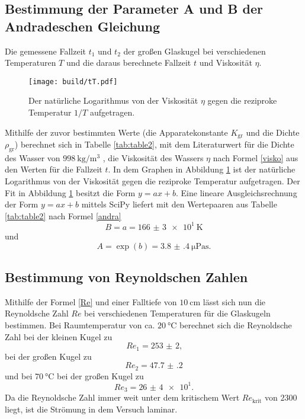 \subsection{Bestimmung der Parameter A und B der Andradeschen Gleichung}
\begin{table}
	\centering
	\caption{Die gemessene Fallzeit $t_1$ und $t_2$ der großen Glaskugel bei verschiedenen Temperaturen $T$ und die daraus berechnete Fallzeit $t$ und Viskosität $\eta$.}
	
\end{table}
\begin{figure}
	\centering
	\caption{Der natürliche Logarithmus von der Viskosität $\eta$ gegen die reziproke Temperatur $1/T$ aufgetragen.}
	\texttt{[image: build/tT.pdf]}
	\label{fig:Graph}
\end{figure}
Mithilfe der zuvor bestimmten Werte (die Apparatekonstante $K_\text{gr}$ und die Dichte $\rho_\text{gr}$) berechnet sich in Tabelle \ref{tab:table2}, mit dem Literaturwert für die Dichte des Wasser von $\SI{998}{\kilo\gram\per\meter\tothe{3}}$ \cite{eta}, die Viskosität des Wassers $\eta$ nach Formel \eqref{visko} aus den Werten für die Fallzeit $t$. In dem Graphen in Abbildung \ref{fig:Graph} ist der natürliche Logarithmus von der Viskosität gegen die reziproke Temperatur aufgetragen.
Der Fit in Abbildung \ref{fig:Graph} besitzt die Form $y=a x + b$. Eine lineare Ausgleichsrechnung der Form $y=a x + b$ mittels SciPy \cite{scipy} liefert mit den Wertepaaren aus Tabelle \ref{tab:table2} nach Formel \eqref{andra}
\begin{displaymath}
	B = a = \SI{166(3)e1}{\kelvin}
\end{displaymath}
und
\begin{displaymath}
	A = \exp(b) = \SI{3.8(4)}{\micro\pascal\second}\text{.}
\end{displaymath}


\subsection{Bestimmung von Reynoldschen Zahlen}
Mithilfe der Formel \eqref{Re} und einer Falltiefe von $\SI{10}{\centi\meter}$ lässt sich nun die Reynoldsche Zahl $Re$ bei verschiedenen Temperaturen für die Glaskugeln bestimmen. Bei Raumtemperatur von ca. $\SI{20}{\degreeCelsius}$ berechnet sich die Reynoldsche Zahl bei der kleinen Kugel zu
\begin{displaymath}
	Re_1 = \num{253(2)}\text{,}
\end{displaymath}
 bei der großen Kugel zu
\begin{displaymath}
	Re_2 = \num{47.7(2)}
\end{displaymath}
und bei $\SI{70}{\degreeCelsius}$ bei der großen Kugel zu
\begin{displaymath}
Re_3 = \num{26(4)e1}\text{.}
\end{displaymath}
Da die Reynoldsche Zahl immer weit unter dem kritischem Wert $Re_\text{krit}$ von $2300$ \cite{Rekrit} liegt, ist die Strömung in dem Versuch laminar. 
